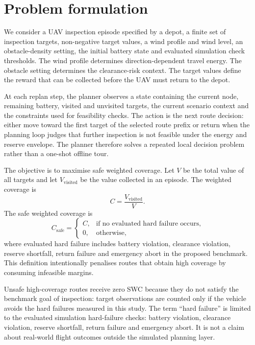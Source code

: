 \documentclass[preprint,12pt]{elsarticle}
\begin{document}
\section{Problem formulation}

We consider a UAV inspection episode specified by a depot, a finite set of inspection targets, non-negative target values, a wind profile and wind level, an obstacle-density setting, the initial battery state and evaluated simulation check thresholds. The wind profile determines direction-dependent travel energy. The obstacle setting determines the clearance-risk context. The target values define the reward that can be collected before the UAV must return to the depot.

At each replan step, the planner observes a state containing the current node, remaining battery, visited and unvisited targets, the current scenario context and the constraints used for feasibility checks. The action is the next route decision: either move toward the first target of the selected route prefix or return when the planning loop judges that further inspection is not feasible under the energy and reserve envelope. The planner therefore solves a repeated local decision problem rather than a one-shot offline tour.

The objective is to maximise safe weighted coverage. Let $V$ be the total value of all targets and let $V_{\mathrm{visited}}$ be the value collected in an episode. The weighted coverage is
\begin{equation}
    C = \frac{V_{\mathrm{visited}}}{V}.
\end{equation}
The safe weighted coverage is
\begin{equation}
    C_{\mathrm{safe}} =
    \begin{cases}
    C, & \text{if no evaluated hard failure occurs},\\
    0, & \text{otherwise,}
    \end{cases}
\end{equation}
where evaluated hard failure includes battery violation, clearance violation, reserve shortfall, return failure and emergency abort in the proposed benchmark. This definition intentionally penalises routes that obtain high coverage by consuming infeasible margins.

Unsafe high-coverage routes receive zero SWC because they do not satisfy the benchmark goal of inspection: target observations are counted only if the vehicle avoids the hard failures measured in this study. The term ``hard failure'' is limited to the evaluated simulation hard-failure checks: battery violation, clearance violation, reserve shortfall, return failure and emergency abort. It is not a claim about real-world flight outcomes outside the simulated planning layer.
\end{document}
